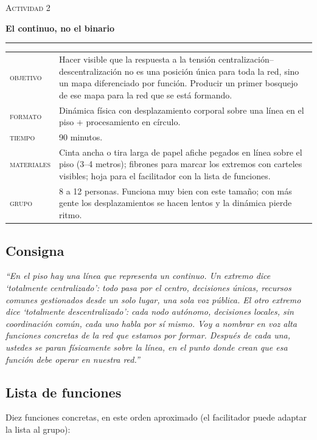 \documentclass[11pt, a4paper]{article}
\newcommand{\etiqueta}[1]{\textcolor{organizacionVerde}{\scshape #1}}
\newcommand{\tituloActividad}[2]{%
  {\color{tenue}\scshape\normalsize Actividad #1}\par
  \vspace{0.15em}
  {\color{organizacionVerde}\LARGE\bfseries #2}\par
  \vspace{0.3em}
  {\color{regla}\rule{\linewidth}{0.4pt}}\par
  \vspace{0.5em}
}
\begin{document}
\begin{actividad}
\tituloActividad{2}{El continuo, no el binario}

\begin{ficha}
\begin{tabular}{@{}p{6em}@{\hspace{1em}}p{\dimexpr\linewidth-7.6em}@{}}
  \etiqueta{objetivo}   & Hacer visible que la respuesta a la tensión centralización--descentralización no es una posición única para toda la red, sino un mapa diferenciado por función. Producir un primer bosquejo de ese mapa para la red que se está formando. \\[0.35em]
  \etiqueta{formato}    & Dinámica física con desplazamiento corporal sobre una línea en el piso + procesamiento en círculo. \\[0.35em]
  \etiqueta{tiempo}     & 90 minutos. \\[0.35em]
  \etiqueta{materiales} & Cinta ancha o tira larga de papel afiche pegados en línea sobre el piso (3--4 metros); fibrones para marcar los extremos con carteles visibles; hoja para el facilitador con la lista de funciones. \\[0.35em]
  \etiqueta{grupo}      & 8 a 12 personas. Funciona muy bien con este tamaño; con más gente los desplazamientos se hacen lentos y la dinámica pierde ritmo.
\end{tabular}
\end{ficha}

\subsection*{Consigna}
\emph{``En el piso hay una línea que representa un continuo. Un extremo dice `totalmente centralizado': todo pasa por el centro, decisiones únicas, recursos comunes gestionados desde un solo lugar, una sola voz pública. El otro extremo dice `totalmente descentralizado': cada nodo autónomo, decisiones locales, sin coordinación común, cada uno habla por sí mismo. Voy a nombrar en voz alta funciones concretas de la red que estamos por formar. Después de cada una, ustedes se paran físicamente sobre la línea, en el punto donde crean que esa función debe operar en nuestra red.''}

\subsection*{Lista de funciones}
Diez funciones concretas, en este orden aproximado (el facilitador puede adaptar la lista al grupo):


\end{actividad}
\end{document}
